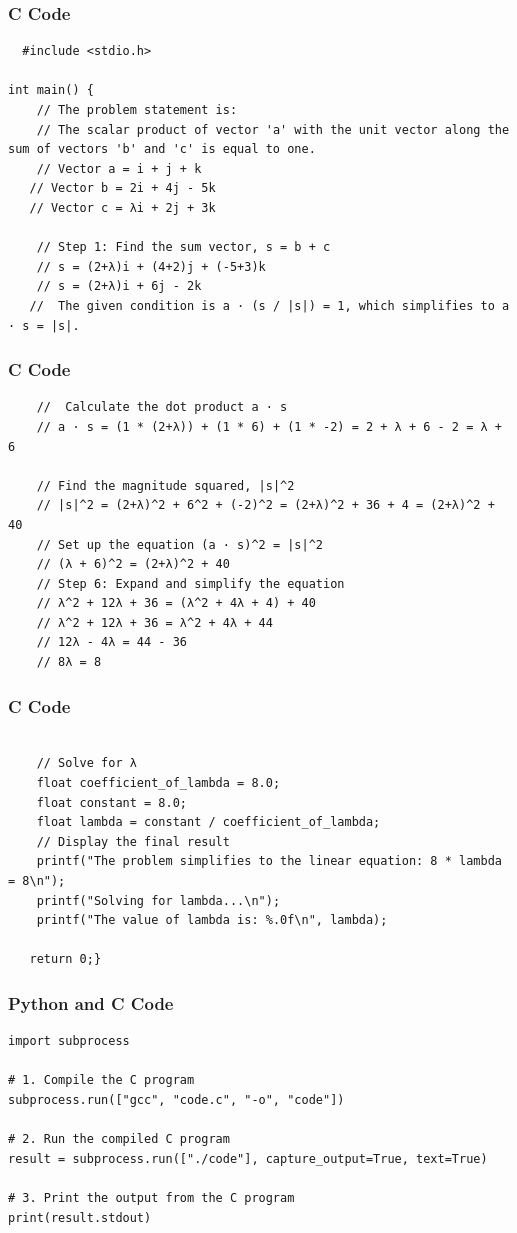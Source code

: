 \documentclass{beamer}
\begin{document}
\begin{frame}[fragile]
\frametitle{C Code}
\begin{lstlisting}
  #include <stdio.h>

int main() {
    // The problem statement is:
    // The scalar product of vector 'a' with the unit vector along the sum of vectors 'b' and 'c' is equal to one.
    // Vector a = i + j + k
   // Vector b = 2i + 4j - 5k
   // Vector c = λi + 2j + 3k

    // Step 1: Find the sum vector, s = b + c
    // s = (2+λ)i + (4+2)j + (-5+3)k
    // s = (2+λ)i + 6j - 2k
   //  The given condition is a · (s / |s|) = 1, which simplifies to a · s = |s|.
\end{lstlisting}

\end{frame}
\begin{frame}[fragile]
\frametitle{C Code}
\begin{lstlisting}
    //  Calculate the dot product a · s
    // a · s = (1 * (2+λ)) + (1 * 6) + (1 * -2) = 2 + λ + 6 - 2 = λ + 6

    // Find the magnitude squared, |s|^2
    // |s|^2 = (2+λ)^2 + 6^2 + (-2)^2 = (2+λ)^2 + 36 + 4 = (2+λ)^2 + 40
    // Set up the equation (a · s)^2 = |s|^2
    // (λ + 6)^2 = (2+λ)^2 + 40
    // Step 6: Expand and simplify the equation
    // λ^2 + 12λ + 36 = (λ^2 + 4λ + 4) + 40
    // λ^2 + 12λ + 36 = λ^2 + 4λ + 44
    // 12λ - 4λ = 44 - 36
    // 8λ = 8
\end{lstlisting}
\end{frame}
\begin{frame}[fragile]
\frametitle{C Code}
\begin{lstlisting}

    // Solve for λ
    float coefficient_of_lambda = 8.0;
    float constant = 8.0;
    float lambda = constant / coefficient_of_lambda;
    // Display the final result
    printf("The problem simplifies to the linear equation: 8 * lambda = 8\n");
    printf("Solving for lambda...\n");
    printf("The value of lambda is: %.0f\n", lambda);

   return 0;}
\end{lstlisting}

\end{frame}


\begin{frame}[fragile]
\frametitle{Python and C Code}

\begin{lstlisting}
import subprocess

# 1. Compile the C program
subprocess.run(["gcc", "code.c", "-o", "code"])

# 2. Run the compiled C program
result = subprocess.run(["./code"], capture_output=True, text=True)

# 3. Print the output from the C program
print(result.stdout)
\end{lstlisting}

\end{frame}
\end{document}
